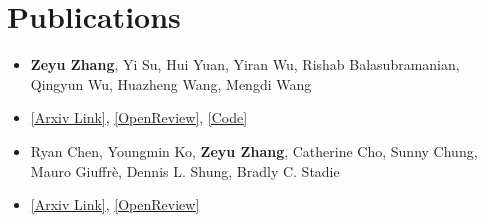 \section{Publications}
\resumeSubHeadingListStart
{}
\begin{itemize}
    \item \small \textbf{Zeyu Zhang}, Yi Su, Hui Yuan, Yiran Wu, Rishab Balasubramanian, Qingyun Wu, Huazheng Wang, Mengdi Wang
    \item \small \href{https://arxiv.org/abs/2306.07528}{[Arxiv Link]}, \href{https://openreview.net/forum?id=oDcWnfZyZW}{[OpenReview]}, \href{https://github.com/ZeyuZhang1901/Unified-Off-Policy-LTR-Neurips2023}{[Code]}
\end{itemize}
\vspace{-8pt}
\begin{itemize}
    \item \small Ryan Chen, Youngmin Ko, \textbf{Zeyu Zhang}, Catherine Cho, Sunny Chung, Mauro Giuffrè, Dennis L. Shung, Bradly C. Stadie
    \item \small \href{https://arxiv.org/abs/2505.11772}{[Arxiv Link]}, \href{https://openreview.net/forum?id=mynHcPXsMv}{[OpenReview]}
\end{itemize}
\resumeSubHeadingListEnd
\vspace{-5pt}